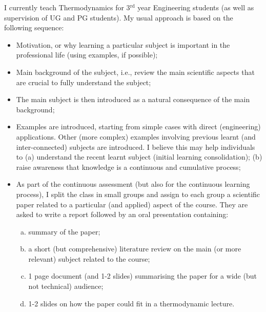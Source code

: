 \documentclass[14pt,twoside]{article}
\begin{document}
I currently teach Thermodynamics for 3$^{\text{rd}}$ year Engineering students (as well as supervision of UG and PG students). My usual approach is based on the following sequence: 
\begin{itemize}
\item Motivation, or why learning a particular subject is important in the professional life (using examples, if possible);
\item Main background of the subject, i.e., review the main scientific aspects that are crucial to fully understand the subject;
\item The main subject is then introduced as a natural consequence of the main background;
\item Examples are introduced, starting from simple cases with direct (engineering) applications. Other (more complex) examples involving previous learnt (and inter-connected) subjects are introduced. I believe this may help individuals to (a) understand the recent learnt subject (initial learning consolidation); (b) raise awareness that knowledge is a continuous and cumulative process;
\item As part of the continuous assessment (but also for the continuous learning process), I split the class in small groups and assign to each group a scientific paper related to a particular (and applied) aspect of the course. They are asked to write a report followed by an oral presentation containing:
\begin{enumerate}[(a)]
\item summary of the paper;
\item a short (but comprehensive) literature review on the main (or more relevant) subject related to the course;
\item 1 page document (and 1-2 slides) summarising the paper for a wide (but not technical) audience;
\item 1-2 slides on how the paper could fit in a thermodynamic lecture.
\end{enumerate}
\end{itemize} 
\end{document}
